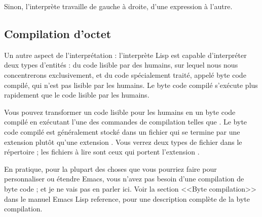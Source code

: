 Sinon, l'interprète travaille de gauche à droite, d'une expression à
l'autre.

\subsection{Compilation d'octet}

Un autre aspect de l'interprétation : l'interprète Lisp est capable
d'interpréter deux types d'entités : du code lisible par des humains,
sur lequel nous nous concentrerons exclusivement, et du code
spécialement traité, appelé byte code compilé, qui n'est pas lisible
par les humains. Le byte code compilé s'exécute plus rapidement que le
code lisible par les humains. 

Vous pouvez transformer un code lisible pour les humains en un byte
code compilé en exécutant l'une des commandes de compilation telles
que . Le byte code compilé est généralement
stocké dans un fichier qui se termine par une extension 
plutôt qu'une extension . Vous verrez deux types de fichier
dans le répertoire  ; les fichiers à lire sont ceux qui
portent l'extension .

En pratique, pour la plupart des choses que vous pourriez faire pour
personnaliser ou étendre Emacs, vous n'avez pas besoin d'une
compilation de byte code ; et je ne vais pas en parler ici. Voir la
section <<Byte compilation>> dans le manuel Emacs Lisp reference, pour
une description complète de la byte compilation.
 

